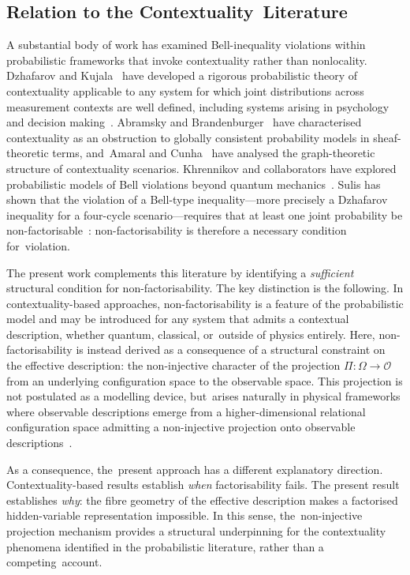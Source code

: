 \documentclass[11pt,a4paper]{article}
\theoremstyle{remark}
\begin{document}
  \subsection{Relation to the Contextuality~Literature}
    \label{subsec:contextuality-literature}

    A substantial body of work has examined Bell-inequality violations within
    probabilistic frameworks that invoke contextuality rather than nonlocality.
    Dzhafarov and Kujala~\cite{Dzhafarov2017} have developed a rigorous probabilistic
    theory of contextuality applicable to any system for which joint distributions across
    measurement contexts are well defined, including systems arising in psychology and
    decision making~\cite{Sulis2025}.
    Abramsky and Brandenburger~\cite{AbramskyBrandenburger2011} have characterised
    contextuality as an obstruction to globally consistent probability models in sheaf-theoretic
    terms, and~Amaral and Cunha~\cite{Amaral2018} have analysed the graph-theoretic
    structure of contextuality scenarios.
    Khrennikov and collaborators have explored probabilistic models of Bell violations
    beyond quantum mechanics~\cite{Haven2014}.
    Sulis has shown that the violation of a Bell-type inequality---more precisely a
    Dzhafarov inequality for a four-cycle scenario---requires that at least one joint
    probability be non-factorisable~\cite{Sulis2025}: non-factorisability is therefore
    a necessary condition for~violation.

    The present work complements this literature by identifying a \emph{sufficient}
    structural condition for non-factorisability.
    The key distinction is the following.
    In contextuality-based approaches, non-factorisability is a feature of the
    probabilistic model and may be introduced for any system that admits a contextual
    description, whether quantum, classical, or~outside of physics entirely.
    Here, non-factorisability is instead derived as a consequence of a structural
    constraint on the effective description: the non-injective character of the projection
    $\Pi : \Omega \to \mathcal{O}$ from an underlying configuration space to the observable
    space.
    This projection is not postulated as a modelling device, but~arises naturally in
    physical frameworks where observable descriptions emerge from a higher-dimensional
    relational configuration space admitting a non-injective projection
    onto observable descriptions~\cite{Beau2026a}.

    As a consequence, the~present approach has a different explanatory direction.
    Contextuality-based results establish \emph{when} factorisability fails.
    The present result establishes \emph{why}: the fibre geometry of the effective
    description makes a factorised hidden-variable representation impossible.
    In this sense, the~non-injective projection mechanism provides a structural
    underpinning for the contextuality phenomena identified in the probabilistic
    literature, rather than a competing~account.
\end{document}
